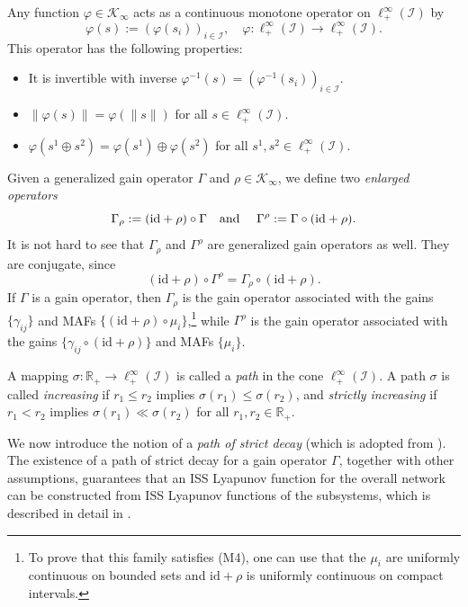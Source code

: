 \documentclass[10pt, oneside, a4paper]{article}
\newcommand{\R}{\mathbb{R}}
\newcommand{\id}{\mathrm{id}}
\newcommand{\IC}{\mathcal{I}}
\newcommand{\KC}{\mathcal{K}}
\begin{document}
Any function $\varphi \in \KC_{\infty}$ acts as a continuous monotone operator on $\ell^{\infty}_+(\IC)$ by%
\begin{equation*}
  \varphi(s) := (\varphi(s_i))_{i\in\IC},\quad \varphi:\ell^{\infty}_+(\IC) \rightarrow \ell^{\infty}_+(\IC).%
\end{equation*}
This operator has the following properties:%
\begin{itemize}
\item It is invertible with inverse $\varphi^{-1}(s) = (\varphi^{-1}(s_i))_{i\in\IC}$.%
\item $\|\varphi(s)\| = \varphi(\|s\|)$ for all $s \in \ell^{\infty}_+(\IC)$.%
\item $\varphi(s^1 \oplus s^2) = \varphi(s^1) \oplus \varphi(s^2)$ for all $s^1,s^2 \in \ell^{\infty}_+(\IC)$.%
\end{itemize}
Given a generalized gain operator $\Gamma$ and $\rho \in \KC_{\infty}$, we define two \emph{enlarged operators}%
\begin{equation*}
  \Gamma_{\rho} := (\id + \rho) \circ \Gamma \mbox{\quad and \quad} \Gamma^{\rho} := \Gamma \circ (\id + \rho).%
\end{equation*}
It is not hard to see that $\Gamma_{\rho}$ and $\Gamma^{\rho}$ are generalized gain operators as well. They are conjugate, since%
\begin{equation}\label{eq_op_conj}
  (\id + \rho) \circ \Gamma^{\rho} = \Gamma_{\rho} \circ (\id + \rho).%
\end{equation}
If $\Gamma$ is a gain operator, then $\Gamma_{\rho}$ is the gain operator associated with the gains $\{\gamma_{ij}\}$ and MAFs $\{(\id + \rho) \circ \mu_i\}$,\footnote{To prove that this family satisfies (M4), one can use that the $\mu_i$ are uniformly continuous on bounded sets and $\id + \rho$ is uniformly continuous on compact intervals.} while $\Gamma^{\rho}$ is the gain operator associated with the gains $\{\gamma_{ij} \circ (\id + \rho)\}$ and MAFs $\{\mu_i\}$.

A mapping $\sigma:\R_+ \rightarrow \ell^{\infty}_+(\IC)$ is called a \emph{path} in the cone $\ell^{\infty}_+(\IC)$. A path $\sigma$ is called \emph{increasing} if $r_1 \leq r_2$ implies $\sigma(r_1) \leq \sigma(r_2)$, and \emph{strictly increasing} if $r_1 < r_2$ implies $\sigma(r_1) \ll \sigma(r_2)$ for all $r_1,r_2 \in \R_+$.%

We now introduce the notion of a \emph{path of strict decay} (which is adopted from \cite[Def.~II.10]{KMZ}). The existence of a path of strict decay for a gain operator $\Gamma$, together with other assumptions, guarantees that an ISS Lyapunov function for the overall network can be constructed from ISS Lyapunov functions of the subsystems, which is described in detail in \cite[Sec.~2]{KZa}.%
\end{document}
